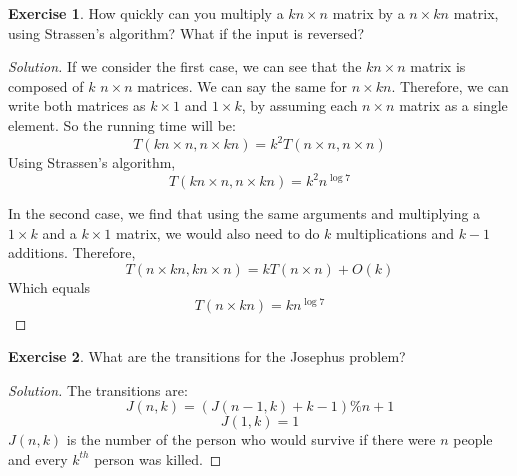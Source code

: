 \documentclass[12pt,letterpaper]{article}
\theoremstyle{definition}
\newtheorem*{exercise}{Exercise}
\newenvironment{solution}
  {\renewcommand\qedsymbol{$\blacksquare$}\begin{proof}[Solution]}
  {\end{proof}}
\begin{document}
\begin{exercise}
  How quickly can you multiply a $kn \times n$ matrix by a $n \times kn$ matrix, using Strassen's algorithm? What if the input is reversed?
\end{exercise}
\begin{solution}
  If we consider the first case, we can see that the $kn \times n$ matrix is composed of $k$ $n \times n$ matrices. We can say the same for $n \times kn$. Therefore, we can write both matrices as $k \times 1$ and $1 \times k$, by assuming each $n \times n$ matrix as a single element. So the running time will be:
  \[T(kn \times n, n \times kn) = k^2 T(n \times n, n \times n)\]
Using Strassen's algorithm,
\[T(kn \times n, n \times kn) = k^2 n^{\log 7}\]

In the second case, we find that using the same arguments and multiplying a $1 \times k$ and a $k \times 1$ matrix, we would also need to do $k$ multiplications and $k-1$ additions. Therefore,
\[T(n \times kn, kn \times n) = kT(n \times n) + O(k)\]
Which equals
\[T(n \times kn) = k n^{\log 7}\]
\end{solution}

\begin{exercise}
  What are the transitions for the Josephus problem?
\end{exercise}
\begin{solution}
  The transitions are:
  \[J(n,k) = (J(n-1,k) + k - 1)\%n + 1\]
  \[J(1,k) = 1\]
  $J(n,k)$ is the number of the person who would survive if there were $n$ people and every $k^{th}$ person was killed.
\end{solution}
\end{document}

